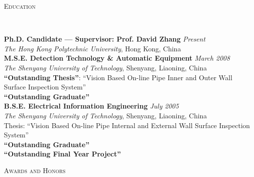 \documentclass[9pt]{article}
\newenvironment{changemargin}[2]{%
  \begin{list}{}{%
    \setlength{\topsep}{0pt}%
    \setlength{\leftmargin}{#1}%
    \setlength{\rightmargin}{#2}%
    \setlength{\listparindent}{\parindent}%
    \setlength{\itemindent}{\parindent}%
    \setlength{\parsep}{\parskip}%
  }%
  \item[]}{\end{list}
}
\newcommand{\lineover}{
	\begin{changemargin}{-0.05in}{-0.05in}
		\vspace*{-8pt}
		\hrulefill \\
		\vspace*{-2pt}
	\end{changemargin}
}
\newcommand{\header}[1]{
	\begin{changemargin}{-0.5in}{-0.5in}
		\scshape{#1}\\
  	\lineover
	\end{changemargin}
}
\newenvironment{body} {
	\vspace*{-16pt}
	\begin{changemargin}{-0.25in}{-0.5in}
  }	
	{\end{changemargin}
}
\begin{document}
\medskip


\header{Education}

\begin{body}
	\vspace{14pt}
	\textbf{Ph.D. Candidate --- Supervisor: Prof. David Zhang}{} \hfill \emph{Present}{} \\
	\emph{The Hong Kong Polytechnic University}, Hong Kong, China{} \\
  \medskip
	\textbf{M.S.E. Detection Technology \& Automatic Equipment}{} \hfill \emph{March 2008}{} \\
	\emph{The Shenyang University of Technology}, Shenyang, Liaoning, China{} \\
	\textbf{``Outstanding Thesis''}: ``Vision Based On-line Pipe Inner and Outer Wall Surface Inspection System''\\
    \textbf{``Outstanding Graduate''}\\
  \medskip
	\textbf{B.S.E. Electrical Information Engineering} \hfill \emph{July 2005} \\
    \emph{The Shenyang University of Technology}, Shenyang, Liaoning, China{} \\
    Thesis: ``Vision Based On-line Pipe Internal and External Wall Surface Inspection System''\\
    \textbf{``Outstanding Graduate''}\\
    \textbf{``Outstanding Final Year Project''}\\
\end{body}

\medskip


\header{Awards and Honors}
\end{document}
